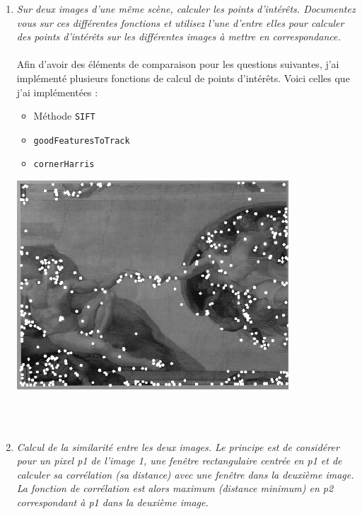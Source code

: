 \documentclass{article}
\begin{document}
\begin{enumerate}
    \item \textit{Sur deux images d’une même scène, calculer les points d’intérêts. Documentez vous sur ces différentes fonctions et utilisez l’une d’entre elles pour calculer des points d’intérêts sur les différentes images à mettre en correspondance.\\}
    \\Afin d'avoir des éléments de comparaison pour les questions suivantes, j'ai implémenté plusieurs fonctions de calcul de points d'intérêts. Voici celles que j'ai implémentées :\\
    \begin{itemize}
        \item Méthode \verb+SIFT+
        \item \verb+goodFeaturesToTrack+
        \item \verb+cornerHarris+
    \end{itemize}
    \begin{minipage}{\linewidth}
        \centering
        \includegraphics[width=0.8\textwidth]{SIFT}
        \label{fig:sift}
    \end{minipage}
    \\\\

    \item \textit{Calcul de la similarité entre les deux images. Le principe est de considérer pour un pixel p1 de l’image 1, une fenêtre rectangulaire centrée en p1 et de calculer sa corrélation (sa distance) avec une fenêtre dans la deuxième image. La fonction de corrélation est alors maximum (distance minimum) en p2 correspondant à p1 dans la deuxième image. \\}
    

\end{enumerate}
\end{document}
